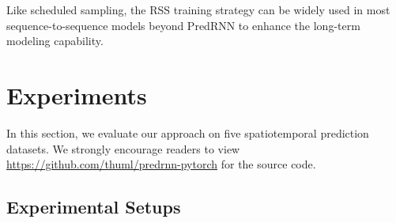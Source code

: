 \documentclass[10pt,journal,compsoc]{IEEEtran}
\begin{document}
Like scheduled sampling, the RSS training strategy can be widely used in most sequence-to-sequence models beyond PredRNN to enhance the long-term modeling capability.



\section{Experiments}

In this section, we evaluate our approach on five spatiotemporal prediction datasets. We strongly encourage readers to view \url{https://github.com/thuml/predrnn-pytorch} for the source code.



\subsection{Experimental Setups}
\end{document}
